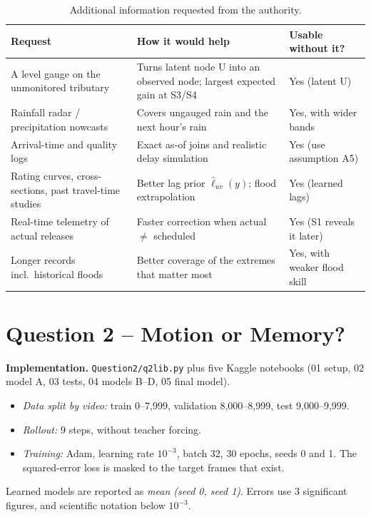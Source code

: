 \documentclass[11pt]{article}
\begin{document}
\begin{table}[H]
\centering\small
\caption{Additional information requested from the authority.}
\begin{tabularx}{\linewidth}{@{}p{4.2cm} Y p{3.3cm}@{}}
\toprule
Request & How it would help & Usable without it?\\
\midrule
A level gauge on the unmonitored tributary & Turns latent node U into an observed node; largest expected gain at S3/S4 & Yes (latent U)\\
Rainfall radar / precipitation nowcasts & Covers ungauged rain and the next hour's rain & Yes, with wider bands\\
Arrival-time and quality logs & Exact as-of joins and realistic delay simulation & Yes (use assumption A5)\\
Rating curves, cross-sections, past travel-time studies & Better lag prior $\hat\ell_{uv}(y)$; flood extrapolation & Yes (learned lags)\\
Real-time telemetry of actual releases & Faster correction when actual $\neq$ scheduled & Yes (S1 reveals it later)\\
Longer records incl.\ historical floods & Better coverage of the extremes that matter most & Yes, with weaker flood skill\\
\bottomrule
\end{tabularx}
\end{table}

\newpage
\section*{Question 2 -- Motion or Memory?}
\setcounter{table}{0}\setcounter{figure}{0}

\noindent\textbf{Implementation.} \texttt{Question2/q2lib.py} plus five Kaggle notebooks (01 setup, 02 model A, 03 tests, 04 models B--D, 05 final model).
\begin{itemize}
  \item \emph{Data split by video:} train 0--7,999, validation 8,000--8,999, test 9,000--9,999.
  \item \emph{Rollout:} 9 steps, without teacher forcing.
  \item \emph{Training:} Adam, learning rate $10^{-3}$, batch 32, 30 epochs, seeds 0 and 1. The squared-error loss is masked to the target frames that exist.
\end{itemize}
Learned models are reported as \emph{mean (seed 0, seed 1)}. Errors use 3 significant figures, and scientific notation below $10^{-3}$.
\end{document}

